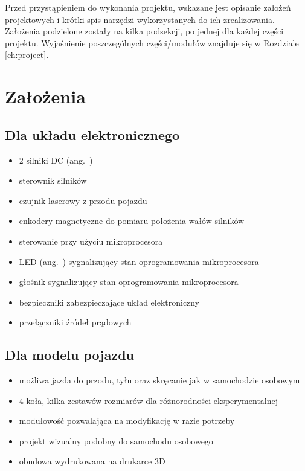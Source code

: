 Przed przystąpieniem do wykonania projektu, wskazane jest opisanie założeń projektowych i krótki spis narzędzi wykorzystanych do ich zrealizowania. Założenia podzielone zostały na kilka podsekcji, po jednej dla każdej części projektu. Wyjaśnienie poszczególnych części/modułów znajduje się w Rozdziale \ref{ch:project}. 

\section{Założenia}
\label{ch:zalozenia}

\subsection*{Dla układu elektronicznego}
\begin{itemize}
    \item 2 silniki DC (ang.~)
    \item sterownik silników
    \item czujnik laserowy z przodu pojazdu
    \item enkodery magnetyczne do pomiaru położenia wałów silników
    \item sterowanie przy użyciu mikroprocesora
    \item LED (ang.~) sygnalizujący stan oprogramowania mikroprocesora
    \item głośnik sygnalizujący stan oprogramowania mikroprocesora
    \item bezpieczniki zabezpieczające układ elektroniczny
    \item przełączniki źródeł prądowych
\end{itemize}

\subsection*{Dla modelu pojazdu}
\begin{itemize}
    \item możliwa jazda do przodu, tyłu oraz skręcanie jak w samochodzie osobowym
    \item 4 koła, kilka zestawów rozmiarów dla różnorodności eksperymentalnej
    \item modułowość pozwalająca na modyfikację w razie potrzeby
    \item projekt wizualny podobny do samochodu osobowego
    \item obudowa wydrukowana na drukarce 3D
\end{itemize}

